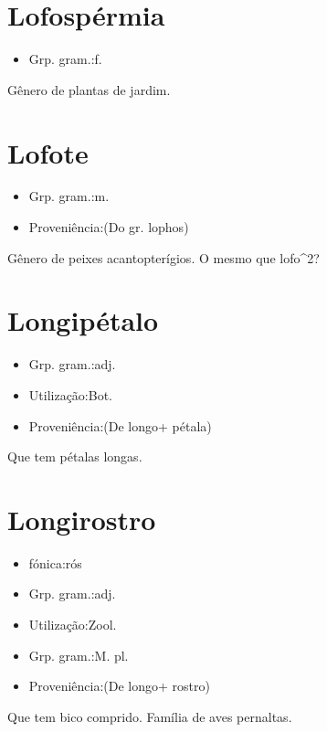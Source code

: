 \section{Lofospérmia}
\begin{itemize}
\item {Grp. gram.:f.}
\end{itemize}
Gênero de plantas de jardim.
\section{Lofote}
\begin{itemize}
\item {Grp. gram.:m.}
\end{itemize}
\begin{itemize}
\item {Proveniência:(Do gr. \textunderscore lophos\textunderscore )}
\end{itemize}
Gênero de peixes acantopterígios.
O mesmo que \textunderscore lofo\textunderscore ^2?
\section{Longipétalo}
\begin{itemize}
\item {Grp. gram.:adj.}
\end{itemize}
\begin{itemize}
\item {Utilização:Bot.}
\end{itemize}
\begin{itemize}
\item {Proveniência:(De \textunderscore longo\textunderscore  + \textunderscore pétala\textunderscore )}
\end{itemize}
Que tem pétalas longas.
\section{Longirostro}
\begin{itemize}
\item {fónica:rós}
\end{itemize}
\begin{itemize}
\item {Grp. gram.:adj.}
\end{itemize}
\begin{itemize}
\item {Utilização:Zool.}
\end{itemize}
\begin{itemize}
\item {Grp. gram.:M. pl.}
\end{itemize}
\begin{itemize}
\item {Proveniência:(De \textunderscore longo\textunderscore  + \textunderscore rostro\textunderscore )}
\end{itemize}
Que tem bico comprido.
Família de aves pernaltas.
